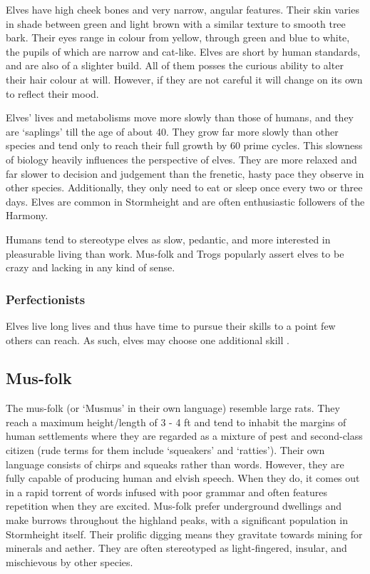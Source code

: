 \documentclass[a4paper,11pt,oneside]{book}
\newcommand{\textlf}[1]{\textbf{\titlecap{#1}}}
\begin{document}
Elves have high cheek bones and very narrow, angular features. Their skin varies in shade between green and light brown with a similar texture to smooth tree bark. Their eyes range in colour from yellow, through green and blue to white, the pupils of which are narrow and cat-like. Elves are short by human standards, and are also of a slighter build. All of them posses the curious ability to alter their hair colour at will. However, if they are not careful it will change on its own to reflect their mood. 

Elves' lives and metabolisms move more slowly than those of humans, and they are `saplings' till the age of about 40. They grow far more slowly than other species and tend only to reach their full growth by 60 prime cycles. This slowness of biology heavily influences the perspective of elves. They are more relaxed and far slower to decision and judgement than the frenetic, hasty pace they observe in other species. Additionally, they only need to eat or sleep once every two or three days. Elves are common in Stormheight and are often enthusiastic followers of the Harmony. 

Humans tend to stereotype elves as slow, pedantic, and more interested in pleasurable living than work. Mus-folk and Trogs popularly assert elves to be crazy and lacking in any kind of sense. 

\subsubsection*{Perfectionists}
Elves live long lives and thus have time to pursue their skills to a point few others can reach. As such, elves may choose one additional skill \textlf{proficiency}.


\subsection{Mus-folk}
The mus-folk (or `Musmus' in their own language) resemble large rats. They reach a maximum height/length of 3 - 4 ft and tend to inhabit the margins of human settlements where they are regarded as a mixture of pest and second-class citizen (rude terms for them include `squeakers' and `ratties'). Their own language consists of chirps and squeaks rather than words. However, they are fully capable of producing human and elvish speech. When they do, it comes out in a rapid torrent of words infused with poor grammar and often features repetition when they are excited. Mus-folk prefer underground dwellings and make burrows throughout the highland peaks, with a significant population in Stormheight itself. Their prolific digging means they gravitate towards mining for minerals and aether. They are often stereotyped as light-fingered, insular, and mischievous by other species.  
\end{document}
